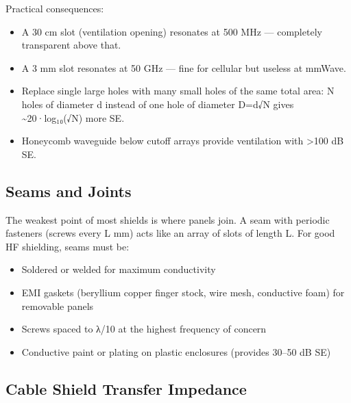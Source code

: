       

Practical consequences:

      
\begin{itemize}

        \item A 30 cm slot (ventilation opening) resonates at 500 MHz — completely transparent above that.

        \item A 3 mm slot resonates at 50 GHz — fine for cellular but useless at mmWave.

        \item Replace single large holes with many small holes of the same total area: N holes of diameter d instead of one hole of diameter D=d√N gives \textasciitilde{}20·log₁₀(√N) more SE.

        \item Honeycomb waveguide below cutoff arrays provide ventilation with \textgreater{}100 dB SE.

      
\end{itemize}

      

\subsection{Seams and Joints}

      

The weakest point of most shields is where panels join. A seam with periodic fasteners (screws every L mm) acts like an array of slots of length L. For good HF shielding, seams must be:

      
\begin{itemize}

        \item Soldered or welded for maximum conductivity

        \item EMI gaskets (beryllium copper finger stock, wire mesh, conductive foam) for removable panels

        \item Screws spaced to λ/10 at the highest frequency of concern

        \item Conductive paint or plating on plastic enclosures (provides 30–50 dB SE)

      
\end{itemize}

      

\subsection{Cable Shield Transfer Impedance}


